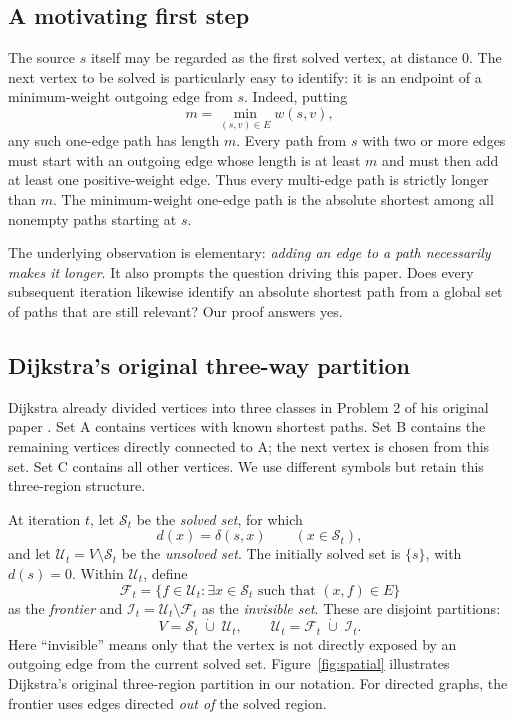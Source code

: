 \documentclass[11pt]{article}
\newcommand{\Sset}{\mathcal{S}_t}
\newcommand{\Uset}{\mathcal{U}_t}
\newcommand{\Fset}{\mathcal{F}_t}
\newcommand{\Iset}{\mathcal{I}_t}
\begin{document}
\subsection{A motivating first step}
The source $s$ itself may be regarded as the first solved vertex, at distance $0$. The next vertex to be solved is particularly easy to identify: it is an endpoint of a minimum-weight outgoing edge from $s$. Indeed, putting
\[
  m=\min_{(s,v)\in E}w(s,v),
\]
any such one-edge path has length $m$. Every path from $s$ with two or more edges must start with an outgoing edge whose length is at least $m$ and must then add at least one positive-weight edge. Thus every multi-edge path is strictly longer than $m$. The minimum-weight one-edge path is the absolute shortest among all nonempty paths starting at $s$.

The underlying observation is elementary: \emph{adding an edge to a path necessarily makes it longer}. It also prompts the question driving this paper. Does every subsequent iteration likewise identify an absolute shortest path from a global set of paths that are still relevant? Our proof answers yes.

\subsection{Dijkstra's original three-way partition}
Dijkstra already divided vertices into three classes in Problem 2 of his original paper \cite{Dijkstra1959}. Set A contains vertices with known shortest paths. Set B contains the remaining vertices directly connected to A; the next vertex is chosen from this set. Set C contains all other vertices. We use different symbols but retain this three-region structure.

At iteration $t$, let $\Sset$ be the \emph{solved set}, for which
\[
 d(x)=\delta(s,x)\qquad (x\in\Sset),
\]
and let $\Uset=V\setminus\Sset$ be the \emph{unsolved set}. The initially solved set is $\{s\}$, with $d(s)=0$. Within $\Uset$, define
\[
\Fset=\{f\in\Uset:\exists x\in\Sset\text{ such that }(x,f)\in E\}
\]
as the \emph{frontier} and $\Iset=\Uset\setminus\Fset$ as the \emph{invisible set}. These are disjoint partitions:
\[
 V=\Sset\;\dot\cup\;\Uset,
 \qquad \Uset=\Fset\;\dot\cup\;\Iset.
\]
Here ``invisible'' means only that the vertex is not directly exposed by an outgoing edge from the current solved set. Figure~\ref{fig:spatial} illustrates Dijkstra's original three-region partition in our notation. For directed graphs, the frontier uses edges directed \emph{out of} the solved region.
\end{document}
